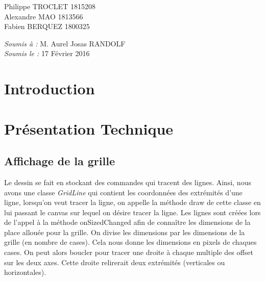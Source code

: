 \documentclass[12pt, a4paper]{article}%
\begin{document}
\begin{titlepage}
\begin{sffamily}
\begin{center}
    \begin{minipage}{0.4\textwidth}
      \begin{flushleft} \large
          Philippe TROCLET \textsc{1815208}\\
          Alexandre  MAO \textsc{1813566}\\
          Fabien  BERQUEZ \textsc{1800325}\\
      \end{flushleft}
    \end{minipage}
    \begin{minipage}{0.4\textwidth}
      \begin{flushright} \large
        \emph{Soumis à :} M. Aurel Josas RANDOLF\\
        \emph{Soumis le :} 17 Février 2016 
      \end{flushright}
    \end{minipage}

    \vfill

  \end{center}
  \end{sffamily}
\end{titlepage}%


\section{Introduction}
\section{Présentation Technique}
    \subsection{Affichage de la grille}
    Le dessin se fait en stockant des commandes qui tracent des lignes. Ainsi, nous avons une classe \textit{GridLine} qui
    contient les coordonnées des extrémités d'une ligne, lorsqu'on veut tracer la ligne, on appelle la méthode draw de cette
    classe en lui passant le canvas sur lequel on désire tracer la ligne. Les lignes sont créées lors de l'appel à la méthode
    onSizedChanged afin de connaître les dimensions de la place allouée pour la grille. On divise les dimensions par les
    dimensions de la grille (en nombre de cases). Cela nous donne les dimensions en pixels de chaques cases. On peut alors boucler
    pour tracer une droite à chaque multiple des offset sur les deux axes. Cette droite relirerait deux extrémités (verticales ou
    horizontales).
    \newline
\end{document}
